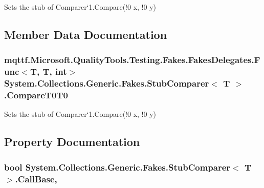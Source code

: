 Sets the stub of Comparer`1.Compare(!0 x, !0 y)



\subsection{Member Data Documentation}
\hypertarget{class_system_1_1_collections_1_1_generic_1_1_fakes_1_1_stub_comparer_3_01_t_01_4_a524a5395e70bdad2c4145d97bf6c43b7}{
\subsubsection[{Compare\-T0\-T0}]{\setlength{\rightskip}{0pt plus 5cm}mqttf.\-Microsoft.\-Quality\-Tools.\-Testing.\-Fakes.\-Fakes\-Delegates.\-Func$<$T, T, int$>$ System.\-Collections.\-Generic.\-Fakes.\-Stub\-Comparer$<$ T $>$.Compare\-T0\-T0}}\label{class_system_1_1_collections_1_1_generic_1_1_fakes_1_1_stub_comparer_3_01_t_01_4_a524a5395e70bdad2c4145d97bf6c43b7}


Sets the stub of Comparer`1.Compare(!0 x, !0 y)



\subsection{Property Documentation}
\hypertarget{class_system_1_1_collections_1_1_generic_1_1_fakes_1_1_stub_comparer_3_01_t_01_4_a373232d662c7a8f9981e211ed89b3533}{
\subsubsection[{Call\-Base}]{\setlength{\rightskip}{0pt plus 5cm}bool System.\-Collections.\-Generic.\-Fakes.\-Stub\-Comparer$<$ T $>$.Call\-Base\hspace{0.3cm}{\ttfamily [get]}, {\ttfamily [set]}}}\label{class_system_1_1_collections_1_1_generic_1_1_fakes_1_1_stub_comparer_3_01_t_01_4_a373232d662c7a8f9981e211ed89b3533}


